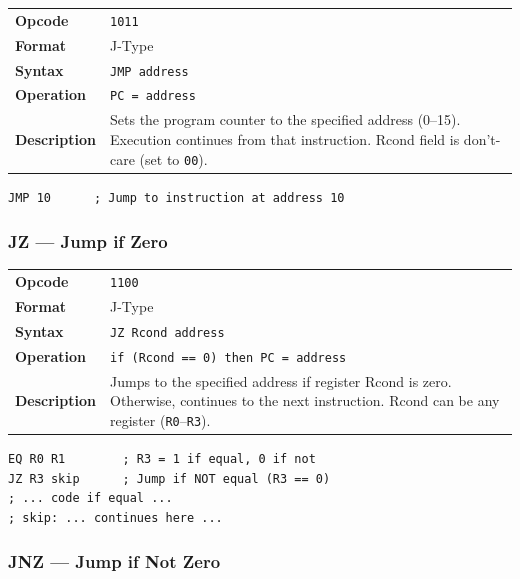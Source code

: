 \documentclass[11pt,a4paper]{article}
\newcommand{\reg}[1]{\texttt{R#1}}
\newcommand{\opcode}[1]{\texttt{#1}}
\begin{document}
\begin{table}[H]
\begin{tabularx}{\textwidth}{@{}lX@{}}
\toprule
\textbf{Opcode}      & \opcode{1011} \\
\textbf{Format}      & J-Type \\
\textbf{Syntax}      & \lstinline|JMP address| \\
\textbf{Operation}   & \texttt{PC = address} \\
\textbf{Description} & Sets the program counter to the specified address (0--15). Execution continues from that instruction. Rcond field is don't-care (set to \texttt{00}). \\
\bottomrule
\end{tabularx}
\end{table}

\begin{lstlisting}
JMP 10      ; Jump to instruction at address 10
\end{lstlisting}

\subsubsection{JZ --- Jump if Zero}

\begin{table}[H]
\begin{tabularx}{\textwidth}{@{}lX@{}}
\toprule
\textbf{Opcode}      & \opcode{1100} \\
\textbf{Format}      & J-Type \\
\textbf{Syntax}      & \lstinline|JZ Rcond address| \\
\textbf{Operation}   & \texttt{if (Rcond == 0) then PC = address} \\
\textbf{Description} & Jumps to the specified address if register Rcond is zero. Otherwise, continues to the next instruction. Rcond can be any register (\reg{0}--\reg{3}). \\
\bottomrule
\end{tabularx}
\end{table}

\begin{lstlisting}
EQ R0 R1        ; R3 = 1 if equal, 0 if not
JZ R3 skip      ; Jump if NOT equal (R3 == 0)
; ... code if equal ...
; skip: ... continues here ...
\end{lstlisting}

\subsubsection{JNZ --- Jump if Not Zero}
\end{document}
